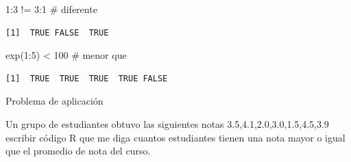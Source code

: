 \documentclass[
  ignorenonframetext,
  aspectratio=169,
  spanish,
]{beamer}
\newenvironment{Shaded}{\begin{snugshade}}{\end{snugshade}}
\newcommand{\CommentTok}[1]{\textcolor[rgb]{0.37,0.37,0.37}{#1}}
\newcommand{\DecValTok}[1]{\textcolor[rgb]{0.68,0.00,0.00}{#1}}
\newcommand{\FunctionTok}[1]{\textcolor[rgb]{0.28,0.35,0.67}{#1}}
\newcommand{\NormalTok}[1]{\textcolor[rgb]{0.00,0.23,0.31}{#1}}
\newcommand{\SpecialCharTok}[1]{\textcolor[rgb]{0.37,0.37,0.37}{#1}}
\begin{document}
\begin{frame}[fragile]{}
\label{section-1}
\begin{Shaded}
\begin{Highlighting}[]
\DecValTok{1}\SpecialCharTok{:}\DecValTok{3} \SpecialCharTok{!=} \DecValTok{3}\SpecialCharTok{:}\DecValTok{1} \CommentTok{\# diferente }
\end{Highlighting}
\end{Shaded}

\begin{verbatim}
[1]  TRUE FALSE  TRUE
\end{verbatim}
\end{frame}

\begin{frame}[fragile]{}
\label{section-2}
\begin{Shaded}
\begin{Highlighting}[]
\FunctionTok{exp}\NormalTok{(}\DecValTok{1}\SpecialCharTok{:}\DecValTok{5}\NormalTok{) }\SpecialCharTok{\textless{}} \DecValTok{100} \CommentTok{\# menor que }
\end{Highlighting}
\end{Shaded}

\begin{verbatim}
[1]  TRUE  TRUE  TRUE  TRUE FALSE
\end{verbatim}
\end{frame}

\begin{frame}{Problema de aplicación}
\label{problema-de-aplicaciuxf3n}
\begin{tcolorbox}[enhanced jigsaw, leftrule=.75mm, opacitybacktitle=0.6, opacityback=0, coltitle=black, breakable, colbacktitle=quarto-callout-important-color!10!white, colback=white, titlerule=0mm, bottomrule=.15mm, left=2mm, bottomtitle=1mm, colframe=quarto-callout-important-color-frame, toptitle=1mm, toprule=.15mm, title=\textcolor{quarto-callout-important-color}{\faExclamation}\hspace{0.5em}{Importante}, arc=.35mm, rightrule=.15mm]

Un grupo de estudiantes obtuvo las siguientes notas
3.5,4.1,2.0,3.0,1.5,4.5,3.9 escribir código R que me diga cuantos
estudiantes tienen una nota mayor o igual que el promedio de nota del
curso.

\end{tcolorbox}
\end{frame}
\end{document}
